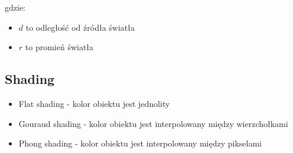 \documentclass{../notatki}
\begin{document}
gdzie:

\begin{itemize}
  \item $d$ to odległość od źródła światła
  \item $r$ to promień światła
\end{itemize}

\subsection{Shading}

\begin{itemize}
  \item Flat shading - kolor obiektu jest jednolity
  \item Gouraud shading - kolor obiektu jest interpolowany między wierzchołkami
  \item Phong shading - kolor obiektu jest interpolowany między pikselami
\end{itemize}
\end{document}

